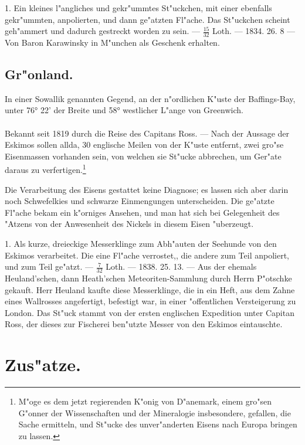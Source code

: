 \documentclass[a4paper, 11pt, oneside, polutonikogreek, german]{article}
\begin{document}
1. Ein kleines l"angliches und gekr"ummtes St"uckchen, mit einer ebenfalls gekr"ummten, anpolierten, und dann ge"atzten Fl"ache. Das St"uckchen scheint geh"ammert und dadurch gestreckt worden zu sein. --- $\frac{15}{32}$ Loth. --- 1834. 26. 8 --- Von Baron Karawinsky in M"unchen als Geschenk erhalten.
\subsection{Gr"onland.}
\begin{center}
\small
In einer Sowallik genannten Gegend, an der n"ordlichen K"uste der Baffings-Bay, unter 76° 22' der Breite und 58° westlicher L"ange von Greenwich.
\end{center}
\paragraph{}
Bekannt seit 1819 durch die Reise des Capitans Ross. --- Nach der Aussage der Eskimos sollen allda, 30 englische Meilen von der K"uste entfernt, zwei gro"se Eisenmassen vorhanden sein, von welchen sie St"ucke abbrechen, um Ger"ate daraus zu verfertigen.\footnote{M"oge es dem jetzt regierenden K"onig von D"anemark, einem gro"sen G"onner der Wissenschaften und der Mineralogie insbesondere, gefallen, die Sache ermitteln, und St"ucke des unver"anderten Eisens nach Europa bringen zu lassen.}

Die Verarbeitung des Eisens gestattet keine Diagnose; es lassen sich aber darin noch Schwefelkies und schwarze Einmengungen unterscheiden. Die ge"atzte Fl"ache bekam ein k"orniges Ansehen, und man hat sich bei Gelegenheit des "Atzens von der Anwesenheit des Nickels in diesem Eisen "uberzeugt.

1. Als kurze, dreieckige Messerklinge zum Abh"auten der Seehunde von den Eskimos verarbeitet. Die eine Fl"ache verrostet,, die andere zum Teil anpoliert, und zum Teil ge"atzt. --- $\frac{7}{32}$ Loth. --- 1838. 25. 13. --- Aus der ehemals Heuland'schen, dann Heath'schen Meteoriten-Sammlung durch Herrn P"otschke gekauft. Herr Heuland kaufte diese Messerklinge, die in ein Heft, aus dem Zahne eines Wallrosses angefertigt, befestigt war, in einer "offentlichen Versteigerung zu London. Das St"uck stammt von der ersten englischen Expedition unter Capitan Ross, der dieses zur Fischerei ben"utzte Messer von den Eskimos eintauschte.
\clearpage
\section{Zus"atze.}
\end{document}
